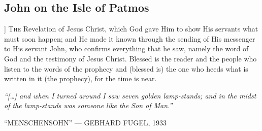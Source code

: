 \begin{pages}
\begin{Leftside}
        			\chapter{John on the Isle of Patmos}
        			]
        	\renewcommand\LettrineFontHook{\Zallmanfamily}
		\lettrine[lines=3]{T}{he} Revelation of Jesus Christ, which God gave Him to show His servants what must soon happen; and He made it known through the sending of His messenger to His servant John, who confirms everything that he saw, namely the word of God and the testimony of Jesus Christ. Blessed is the reader and the people who listen to the words of the prophecy and (blessed is) the one who heeds what is written in it (the prophecy), for the time is near.
		\pend
        \endnumbering
    \end{Leftside}

\end{pages} 
\Pages

\clearpage
\thispagestyle{empty}
\null\vfill
\settowidth{}
\begin{center}
\parbox{\longest}{%
  \raggedright{\huge\itshape%
    ``[…] and when I turned around I saw seven golden lamp-stands; and in the midst of the lamp-stands was someone like the Son of Man.'' \par\bigskip
  }
  \raggedleft\Large\MakeUppercase{``Menschensohn'' — Gebhard Fugel, 1933}\par%
}
\vfill\vfill
\clearpage\newpage
\end{center}
\newpage
\thispagestyle{empty}
\begin{center}
\end{center}